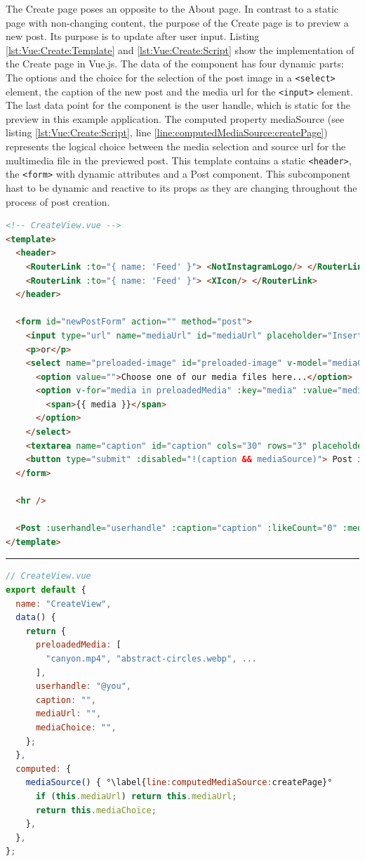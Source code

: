 \documentclass[a4paper, 12pt]{article}
\begin{document}
The Create page poses an opposite to the About page.
In contrast to a static page with non-changing content, the purpose of the Create page is to preview a new post.
Its purpose is to update after user input.
Listing \ref{lst:Vue:Create:Template} and \ref{lst:Vue:Create:Script} show the implementation of the Create page in Vue.js.
The data of the component has four dynamic parts: The options and the choice for the selection of the post image in a \verb|<select>| element, the caption of the new post and the media \acrshort{url} for the \verb|<input>| element.
The last data point for the component is the user handle, which is static for the preview in this example application.
The computed property mediaSource (see listing \ref{lst:Vue:Create:Script}, line \ref{line:computedMediaSource:createPage}) represents the logical choice between the media selection and source \acrshort{url} for the multimedia file in the previewed post.
This template contains a static \verb|<header>|, the \verb|<form>| with dynamic attributes and a Post component.
This subcomponent hast to be dynamic and reactive to its props as they are changing throughout the process of post creation.

\vspace{1cm}
\begin{lstlisting}[caption=Create Page in Vue.js (Template), label={lst:Vue:Create:Template}, language=HTML]
<!-- CreateView.vue -->
<template>
  <header>
    <RouterLink :to="{ name: 'Feed' }"> <NotInstagramLogo/> </RouterLink>
    <RouterLink :to="{ name: 'Feed' }"> <XIcon/> </RouterLink>
  </header>

  <form id="newPostForm" action="" method="post">
    <input type="url" name="mediaUrl" id="mediaUrl" placeholder="Insert your media URL here..." v-model="mediaUrl" />
    <p>or</p>
    <select name="preloaded-image" id="preloaded-image" v-model="mediaChoice">
      <option value="">Choose one of our media files here...</option>
      <option v-for="media in preloadedMedia" :key="media" :value="media">
        <span>{{ media }}</span>
      </option>
    </select>
    <textarea name="caption" id="caption" cols="30" rows="3" placeholder="Type your caption here" v-model="caption"/>
    <button type="submit" :disabled="!(caption && mediaSource)"> Post it! </button>
  </form>

  <hr />

  <Post :userhandle="userhandle" :caption="caption" :likeCount="0" :mediaSource="mediaSource" :hideActionIcons="true" />
</template>
\end{lstlisting}
\hrule
\begin{lstlisting}[caption=Create Page in Vue.js (Script), label={lst:Vue:Create:Script}, language=JavaScript, firstnumber=25, escapechar=°]
// CreateView.vue
export default {
  name: "CreateView",
  data() {
    return {
      preloadedMedia: [
        "canyon.mp4", "abstract-circles.webp", ...
      ],
      userhandle: "@you",
      caption: "",
      mediaUrl: "",
      mediaChoice: "",
    };
  },
  computed: {
    mediaSource() { °\label{line:computedMediaSource:createPage}°
      if (this.mediaUrl) return this.mediaUrl;
      return this.mediaChoice;
    },
  },
};
\end{lstlisting}
\vspace{1cm}
\end{document}
